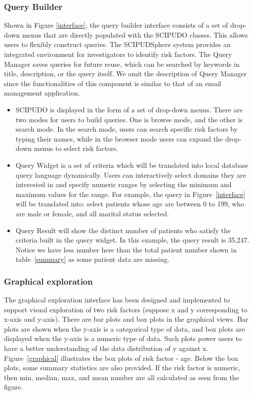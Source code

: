 \documentclass{amia}
\begin{document}
\subsubsection{Query Builder}
Shown in Figure \ref{interface}, the query builder interface consists of a set of drop-down menus that are directly populated with the SCIPUDO classes. This allows users to flexibly construct queries. The SCIPUDSphere system provides an integrated environment for investigators to identify risk factors. The Query Manager saves queries for future reuse, which can be searched by keywords in title, description, or the query itself. We omit the description of Query Manager since the functionalities of this component is similar to that of an email management application.

\vspace{-3mm}
\begin{itemize}
\setlength\itemsep{0em}
  \item SCIPUDO is displayed in the form of a set of drop-down menus. There are two modes for users to build queries. One is browse mode, and the other is search mode. In the search mode, users can search specific risk factors by typing their names, while in the browser mode users can expand the drop-down menus to select risk factors.
  \item Query Widget is a set of criteria which will be translated into local database query language dynamically. Users can interactively select domains they are interested in and specify numeric ranges by selecting the minimum and maximum values for the range. For example, the query in Figure~\ref{interface} will be translated into: select patients whose age are between 0 to 199, who are male or female, and all marital status selected.
  \item Query Result will show the distinct number of patients who satisfy the criteria built in the query widget. In this example, the query result is 35,247. Notice we have less number here than the total patient number shown in table~\ref{summary} as some patient data are missing.
\end{itemize}
\vspace{-3mm}

\subsubsection{Graphical exploration}
The graphical exploration interface has been designed and implemented to support visual exploration of two risk factors (suppose x and y corresponding to x-axis and y-axis). There are bar plots and box plots in the graphical views. Bar plots are shown when the y-axis is a categorical type of data, and box plots are displayed when the y-axis is a numeric type of data. Such plots power users to have a better understanding of the data distribution of y against x. Figure~\ref{graphical} illustrates the box plots of risk factor - age. Below the box plots, some summary statistics are also provided. If the risk factor is numeric, then min, median, max, and mean number are all calculated as seen from the figure.
\end{document}
